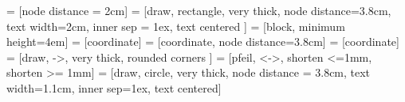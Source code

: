  = [node distance = 2cm]
 =	[draw, rectangle,
	very thick,
	node distance=3.8cm,
	text width=2cm,
	inner sep = 1ex,
	text centered
	]
 = [block, minimum height=4em]
 = [coordinate]
 = [coordinate, node distance=3.8cm]
 = [coordinate]
 = [draw,
	->, very thick, rounded corners
	]
 = [pfeil, <->, shorten <=1mm, shorten >= 1mm]
 = [draw, circle,
	very thick,
	node distance = 3.8cm,
	text width=1.1cm, 
	inner sep=1ex, 
	text centered]